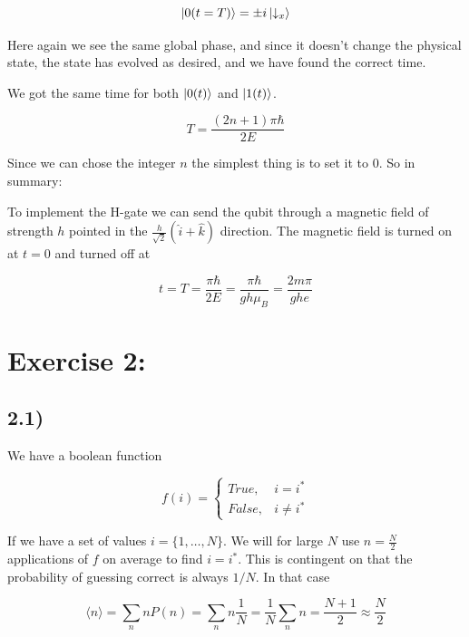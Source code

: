 \documentclass[a4paper,norsk, 10pt]{article}
\begin{document}
\begin{equation}
\ket{0(t=T)} = \pm i \ket{\downarrow_x}
\end{equation}\label{eq:downEvolved}

Here again we see the same global phase, and since it doesn't change the physical state, the state has evolved as desired, and we have found the correct time.

We got the same time for both $\ket{0(t)}$ and $\ket{1(t)}$.

\begin{equation}
T = \frac{(2n + 1)\pi\hbar}{2E}
\end{equation}

Since we can chose the integer $n$ the simplest thing is to set it to $0$. So in summary:


To implement the H-gate we can send the qubit through a magnetic field of strength $h$ pointed in the $\frac{h}{\sqrt{2}}(\hat{i} + \hat{k})$ direction. The magnetic field is turned on at $t = 0$ and turned off at 

\begin{equation}
t  = T = \frac{\pi\hbar}{2E} = \frac{\pi \hbar}{g h \mu_B} = \frac{2m \pi}{g h e}
\end{equation}

\section{Exercise 2:}

\subsection{2.1)}\label{sec:21}

We have a boolean function

\begin{equation}
f(i)=
\begin{cases}
True, & i = i^* \\
False, & i \neq i^*
\end{cases}
\end{equation}

If we have a set of values $i = \{1,\ldots, N\}$. We will for large $N$ use $n = \frac{N}{2}$ applications of $f$ on average to find $i = i^*$. This is contingent on that the probability of guessing correct is always $1/N$. In that case

\begin{equation}
\langle n \rangle = \sum_n nP(n) = \sum_n n \frac{1}{N} = \frac{1}{N}\sum_n n = \frac{N+1}{2} \approx \frac{N}{2}
\end{equation}
\end{document}
